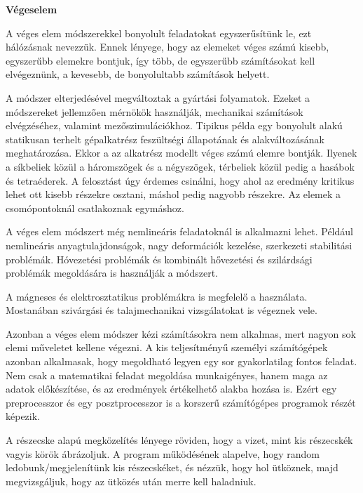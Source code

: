 


\textbf{Végeselem}

A véges elem módszerekkel
bonyolult feladatokat egyszerűsítünk le, ezt hálózásnak nevezzük. Ennek lényege, hogy az elemeket véges számú kisebb, egyszerűbb elemekre bontjuk, így több, de egyszerűbb számításokat kell elvégeznünk, a kevesebb, de bonyolultabb számítások helyett.


A módszer elterjedésével megváltoztak a gyártási folyamatok. Ezeket a módszereket jellemzően mérnökök használják, mechanikai számítások elvégzéséhez, valamint mezőszimulációkhoz. Tipikus példa egy bonyolult alakú statikusan terhelt gépalkatrész feszültségi állapotának és alakváltozásának meghatározása. Ekkor a az alkatrész modellt véges számú elemre bontják. Ilyenek a síkbeliek közül a háromszögek és a négyszögek, térbeliek közül pedig a hasábok és tetraéderek. A felosztást úgy érdemes csinálni, hogy ahol az eredmény kritikus lehet ott kisebb részekre osztani, máshol pedig nagyobb részekre. Az elemek a csomópontoknál csatlakoznak egymáshoz. 


A véges elem módszert még nemlineáris feladatoknál is alkalmazni lehet. Például nemlineáris anyagtulajdonságok, nagy deformációk kezelése, szerkezeti stabilitási problémák. Hóvezetési problémák és kombinált hővezetési és szilárdsági problémák megoldására is használják a módszert. 


A mágneses és elektrosztatikus problémákra is megfelelő a használata. Mostanában szivárgási és talajmechanikai vizsgálatokat is végeznek vele. 

Azonban a véges elem módszer kézi számításokra nem alkalmas, mert nagyon sok elemi műveletet kellene végezni. A kis teljesítményű személyi számítógépek azonban alkalmasak, hogy megoldható legyen egy sor gyakorlatilag fontos feladat. Nem csak a matematikai feladat megoldása munkaigényes, hanem maga az adatok előkészítése, és az eredmények értékelhető alakba hozása is. Ezért egy preprocesszor és egy posztprocesszor is a korszerű számítógépes programok részét képezik.   






A részecske alapú megközelítés lényege röviden, hogy a vizet, mint kis részecskék vagyis körök ábrázoljuk. A program működésének alapelve, hogy random ledobunk/megjelenítünk kis részecskéket, és nézzük, hogy hol ütköznek, majd megvizsgáljuk, hogy az ütközés után merre kell haladniuk. 

